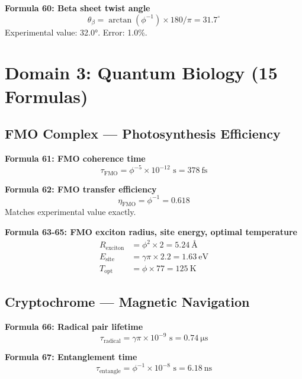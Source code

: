 \documentclass[12pt,a4paper]{article}
\begin{document}
\textbf{Formula 60: Beta sheet twist angle}
\begin{equation}
\theta_{\beta} = \arctan(\phi^{-1}) \times 180/\pi = 31.7^\circ
\end{equation}
Experimental value: 32.0°. Error: 1.0\%.

\section{Domain 3: Quantum Biology (15 Formulas)}

\subsection{FMO Complex — Photosynthesis Efficiency}

\textbf{Formula 61: FMO coherence time}
\begin{equation}
\tau_{\text{FMO}} = \phi^{-5} \times 10^{-12} \text{ s} = \SI{378}{\femto\second}
\end{equation}

\textbf{Formula 62: FMO transfer efficiency}
\begin{equation}
\eta_{\text{FMO}} = \phi^{-1} = 0.618
\end{equation}
Matches experimental value exactly.

\textbf{Formula 63-65: FMO exciton radius, site energy, optimal temperature}
\begin{align}
R_{\text{exciton}} &= \phi^2 \times 2 = \SI{5.24}{\angstrom} \\
E_{\text{site}} &= \gamma \pi \times 2.2 = \SI{1.63}{\eV} \\
T_{\text{opt}} &= \phi \times 77 = \SI{125}{\kelvin}
\end{align}

\subsection{Cryptochrome — Magnetic Navigation}

\textbf{Formula 66: Radical pair lifetime}
\begin{equation}
\tau_{\text{radical}} = \gamma \pi \times 10^{-9} \text{ s} = \SI{0.74}{\micro\s}
\end{equation}

\textbf{Formula 67: Entanglement time}
\begin{equation}
\tau_{\text{entangle}} = \phi^{-1} \times 10^{-8} \text{ s} = \SI{6.18}{\ns}
\end{equation}
\end{document}
